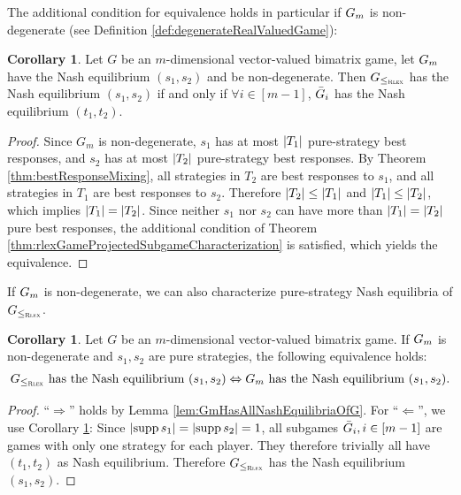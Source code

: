 \documentclass[a4paper]{scrreprt}
\theoremstyle{definition}
\newtheorem{cor}[thm]{Corollary}
\begin{document}
    The additional condition for equivalence holds in particular if $G_{m}$ is non-degenerate (see Definition \ref{def:degenerateRealValuedGame}):
    \begin{cor}        
        \label{cor:degenerateGamesYieldLeqRlexEquivalence}
        Let $G$ be an $m$-dimensional vector-valued bimatrix game, let $G_{m}$ have the Nash equilibrium $(s_1, s_2)$ and be non-degenerate.
        Then $G_{\leq_{\textsc{Rlex}}}$ has the Nash equilibrium $(s_1, s_2)$ if and only if $\forall i \in [m-1]$, $\bar{G}_{i}$ has the Nash equilibrium $(t_1, t_2)$.
    \end{cor}
    \begin{proof}
        Since $G_m$ is non-degenerate, $s_1$ has at most $\left| T_1 \right|$ pure-strategy best responses, and $s_2$ has at most $\left| T_2 \right|$ pure-strategy best responses.
        By Theorem \ref{thm:bestResponseMixing}, all strategies in $T_2$ are best responses to $s_1$, and all strategies in $T_1$ are best responses to $s_2$. Therefore $\left| T_2 \right| \leq \left| T_1 \right|$ and $\left| T_1 \right| \leq \left| T_2 \right|$, which implies $\left| T_1 \right| = \left| T_2 \right|$.
        Since neither $s_1$ nor $s_2$ can have more than $\left| T_1 \right| = \left| T_2 \right|$ pure best responses, the additional condition of Theorem \ref{thm:rlexGameProjectedSubgameCharacterization} is satisfied, which yields the equivalence.
    \end{proof}

    If $G_{m}$ is non-degenerate, we can also characterize pure-strategy Nash equilibria of $G_{\leq_{\textsc{Rlex}}}$.
    \begin{cor}
        \label{cor:degenerateGamesYieldPureEquilibriaGmGEquivalence}
        Let $G$ be an $m$-dimensional vector-valued bimatrix game. If $G_{m}$ is non-degenerate and $s_1, s_2$ are pure strategies, the following equivalence holds:
        \begin{gather*}
            \text{$G_{\leq_{\textsc{Rlex}}}$ has the Nash equilibrium $(s_1, s_2) \Leftrightarrow G_{m}$ has the Nash equilibrium $(s_1, s_2)$.}
        \end{gather*}
    \end{cor}
    \begin{proof}
        “$\Rightarrow$” holds by Lemma \ref{lem:GmHasAllNashEquilibriaOfG}.
        For “$\Leftarrow$”, we use Corollary \ref{cor:degenerateGamesYieldLeqRlexEquivalence}: Since $\left| \operatorname{supp} s_1 \right| = \left| \operatorname{supp} s_2 \right| = 1$, all subgames $\bar{G}_{i}, i \in [m-1]$ are games with only one strategy for each player. They therefore trivially all have $(t_1, t_2)$ as Nash equilibrium.
        Therefore $G_{\leq_{\textsc{Rlex}}}$ has the Nash equilibrium $(s_1, s_2)$.
    \end{proof}
\end{document}
